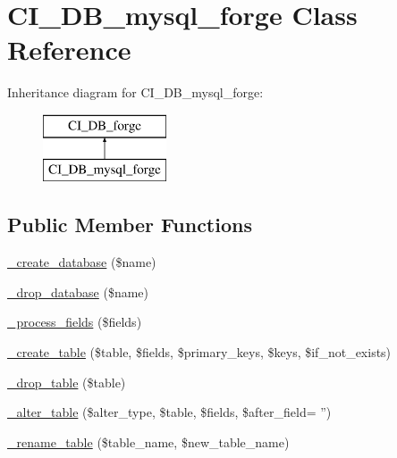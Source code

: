 \hypertarget{class_c_i___d_b__mysql__forge}{\section{C\-I\-\_\-\-D\-B\-\_\-mysql\-\_\-forge Class Reference}
\label{class_c_i___d_b__mysql__forge}
}
Inheritance diagram for C\-I\-\_\-\-D\-B\-\_\-mysql\-\_\-forge\-:\begin{figure}[H]
\begin{center}
\leavevmode
\includegraphics[height=2.000000cm]{class_c_i___d_b__mysql__forge}
\end{center}
\end{figure}
\subsection*{Public Member Functions}
\begin{DoxyCompactItemize}
\item 
\hyperlink{class_c_i___d_b__mysql__forge_ac70184ae4a86e97f324daa1901b78777}{\-\_\-create\-\_\-database} (\$name)
\item 
\hyperlink{class_c_i___d_b__mysql__forge_a6e04d0af5e8e1e1f93f42d63f0744bfd}{\-\_\-drop\-\_\-database} (\$name)
\item 
\hyperlink{class_c_i___d_b__mysql__forge_a338a54bfecc1fbfbe863e980cc8a5d44}{\-\_\-process\-\_\-fields} (\$fields)
\item 
\hyperlink{class_c_i___d_b__mysql__forge_a99d4c17257f468337344690dd590582b}{\-\_\-create\-\_\-table} (\$table, \$fields, \$primary\-\_\-keys, \$keys, \$if\-\_\-not\-\_\-exists)
\item 
\hyperlink{class_c_i___d_b__mysql__forge_a147efb0d859b7cf4148ff75642515231}{\-\_\-drop\-\_\-table} (\$table)
\item 
\hyperlink{class_c_i___d_b__mysql__forge_a5aa3b886f51adfe92fc6abf6261ff881}{\-\_\-alter\-\_\-table} (\$alter\-\_\-type, \$table, \$fields, \$after\-\_\-field= '')
\item 
\hyperlink{class_c_i___d_b__mysql__forge_aec593ba62c6ff875cafeac16b1c54ae6}{\-\_\-rename\-\_\-table} (\$table\-\_\-name, \$new\-\_\-table\-\_\-name)
\end{DoxyCompactItemize}
